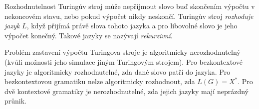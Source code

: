 \begin{poznamkaN}{Rozhodnutelnost}
Turingův stroj může nepřijmout slovo buď skončením výpočtu v nekoncovém stavu, nebo pokud výpočet nikdy neskončí. Turingův stroj \emph{rozhoduje jazyk} $L$, když přijímá právě slova tohoto jazyka a pro libovolné slovo je jeho výpočet konečný. Takové jazyky se nazývají \emph{rekurzivní}.

Problém zastavení výpočtu Turingova stroje je algoritmicky nerozhodnutelný (kvůli možnosti jeho simulace jiným Turingovým strojem). Pro bezkontextové jazyky je algoritmicky rozhodnutelné, zda dané slovo patří do jazyka. Pro bezkontextovou gramatiku nelze algoritmicky rozhodnout, zda $L(G)=X^{\ast}$. Pro dvě kontextové gramatiky je nerozhodnutelné, zda jejich jazyky mají neprázdný průnik.
\end{poznamkaN}
